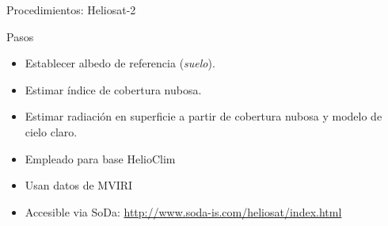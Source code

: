 \documentclass[xcolor={usenames,svgnames,dvipsnames}]{beamer}
\begin{document}
\begin{frame}[label={sec:org163ea0e}]{Procedimientos: Heliosat-2}
\begin{block}{Pasos}
\begin{itemize}
\item Establecer \alert{albedo de referencia} (\emph{suelo}).
\item Estimar \alert{índice de cobertura nubosa}.
\item Estimar radiación en superficie a partir de cobertura nubosa y \alert{modelo de cielo claro}.
\end{itemize}
\end{block}

\begin{block}{}
\begin{itemize}
\item Empleado para base HelioClim
\item Usan datos de MVIRI
\item Accesible via SoDa: \url{http://www.soda-is.com/heliosat/index.html}
\end{itemize}

\nocite{Rigollier.Lefevre.ea2004}
\end{block}
\end{frame}
\end{document}
